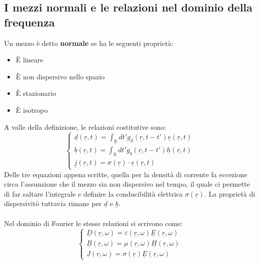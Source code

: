 \documentclass{book}
\begin{document}
    \subsection{I mezzi normali e le relazioni nel dominio della frequenza}
        Un mezzo è detto \textbf{normale} se ha le seguenti proprietà:
        \begin{itemize}
            \item È lineare
            \item È non dispersivo nello spazio
            \item È stazionario
            \item È isotropo
        \end{itemize}
        A valle della definizione, le relazioni costitutive sono:
        \begin{equation}
            \begin{cases}
                \displaystyle\underline{d}(\underline{r},t) = \int_{\mathbb{R}}dt' g_{d}(\underline{r}, t-t')\underline{e}(\underline{r},t) \\
                \displaystyle\underline{b}(\underline{r},t) = \int_{\mathbb{R}}dt' g_{b}(\underline{r}, t-t')\underline{h}(\underline{r},t) \\
                \underline{j}(\underline{r}, t) = \sigma (\underline{r}) \cdot \underline{e}(\underline{r},t)
            \end{cases}
        \end{equation}
        Delle tre equazioni appena scritte, quella per la densità di corrente fa eccezione circa l'assunzione che il mezzo sia non dispersivo nel tempo, il quale ci permette di far saltare l'integrale e definire la conducibilità elettrica $\sigma(\underline{r})$. La proprietà di dispersivitò tuttavia rimane per $\underline{d}$ e $\underline{b}$. \\ \\
        Nel dominio di Fourier le stesse relazioni si scrivono come:
        \begin{equation}
            \begin{cases}
            
            \underline{D}(\underline{r},\omega) = \varepsilon (\underline{r}, \omega) \underline{E}(\underline{r}, \omega) \\
            \underline{B}(\underline{r} ,\omega) = \mu ( \underline{r}, \omega)  \underline{H}(\underline{r}, \omega) \\
            \underline{J}(\underline{r} ,\omega) = \sigma(\underline{r}) \underline{E}(\underline{r}, \omega)
            \end{cases}
        \end{equation}
\end{document}
